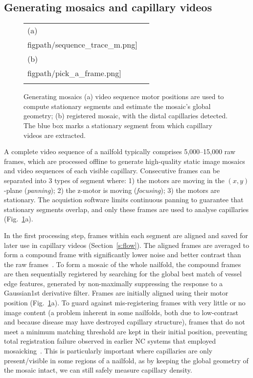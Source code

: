 \documentclass[runningheads,a4paper]{llncs}
\def\figpath{./figs}
\newcommand{\fref}[1]{Fig.~\ref{#1}}
\newcommand{\sref}[1]{Section~\ref{#1}}
\def\figpath{./figs}
\def\eg{e.g.}
\begin{document}
\subsection{Generating mosaics and capillary videos}
%
\begin{figure}[t]
\centering
\begin{tabular}{ m{} m{}  }
(a) &
\texttt{[image: \\figpath/sequence\_trace\_m.png]}\\
(b) &
\texttt{[image: \\figpath/pick\_a\_frame.png]}\\
\noalign{\smallskip}
\end{tabular}
%
\caption{Generating mosaics (a) video sequence motor positions are used to compute stationary segments and estimate the mosaic's global geometry; (b) registered mosaic, with the distal capillaries detected. The blue box marks a stationary segment from which capillary videos are extracted. }
\label{f:capillaroscopy}
\end{figure}
%
A complete video sequence of a nailfold typically comprises 5,000--15,000 raw frames, which are processed offline to generate high-quality static image mosaics and video sequences of each visible capillary. Consecutive frames can be separated into 3 types of segment where: 1) the motors are moving in the $(x,y)$-plane (\textit{panning}); 2) the z-motor is moving (\textit{focusing}); 3) the motors are stationary. The acquistion software limits continuous panning to guarantee that stationary segments overlap, and only these frames are used to analyse capillaries (\fref{f:capillaroscopy}a). 

In the first processing step, frames within each segment are aligned and saved for later use in capillary videos (\sref{s:flow}). The aligned frames are averaged to form a compound frame with significantly lower noise and better contrast than the raw frames~\cite{Allen_etal_MICCAI99}. To form a mosaic of the whole nailfold, the compound frames are then sequentially registered by searching for the global best match of vessel edge features, generated by non-maximally suppressing the response to a Gaussian1st derivative filter. Frames are initially aligned using their motor position (\fref{f:capillaroscopy}a). To guard against mis-registering frames with very little or no image content (a problem inherent in some nailfolds, both due to low-contrast and because disease may have destroyed capillary structure), frames that do not meet a minimum matching threshold are kept in their initial position, preventing total registration failure observed in earlier NC systems that employed mosaicking~\cite{Allen_etal_MICCAI99}. This is particularly important where capillaries are only present/visible in some regions of a nailfold, as by keeping the global geometry of the mosaic intact, we can still safely measure capillary density.
%
\end{document}
